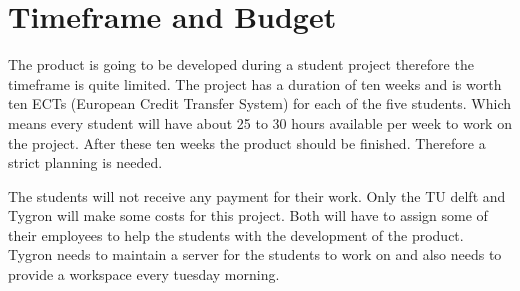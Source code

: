 \section{Timeframe and Budget}
The product is going to be developed during a student project therefore the timeframe is quite limited. The project has a duration of ten weeks and is worth ten ECTs (European Credit Transfer System) for each of the five students. Which means every student will have about 25 to 30 hours available per week  to work on the project. After these ten weeks the product should be finished. Therefore a strict planning is needed. 
\par
The students will not receive any payment for their work. Only the TU delft and Tygron will make some costs for this project. Both will have to assign some of their employees to help the students with the development of the product. Tygron needs to maintain a server for the students to work on and also needs to provide a workspace every tuesday morning.